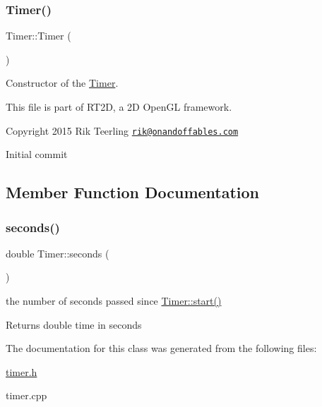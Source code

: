 \subsubsection{\texorpdfstring{Timer()}{Timer()}}
{\footnotesize\ttfamily Timer\+::\+Timer (\begin{DoxyParamCaption}{ }\end{DoxyParamCaption})}



Constructor of the \hyperlink{class_timer}{Timer}. 

This file is part of R\+T2D, a 2D Open\+GL framework.


\begin{DoxyItemize}
\item Copyright 2015 Rik Teerling \href{mailto:rik@onandoffables.com}{\tt rik@onandoffables.\+com}
\begin{DoxyItemize}
\item Initial commit 
\end{DoxyItemize}
\end{DoxyItemize}

\subsection{Member Function Documentation}
\mbox{\label{class_timer_a045bb982f9132c9043fb10be01370485}} 
\subsubsection{\texorpdfstring{seconds()}{seconds()}}
{\footnotesize\ttfamily double Timer\+::seconds (\begin{DoxyParamCaption}{ }\end{DoxyParamCaption})}



the number of seconds passed since \hyperlink{class_timer_a3a8b5272198d029779dc9302a54305a8}{Timer\+::start()} 

\begin{DoxyReturn}{Returns}
double time in seconds 
\end{DoxyReturn}


The documentation for this class was generated from the following files\+:\begin{DoxyCompactItemize}
\item 
\hyperlink{timer_8h}{timer.\+h}\item 
timer.\+cpp\end{DoxyCompactItemize}
